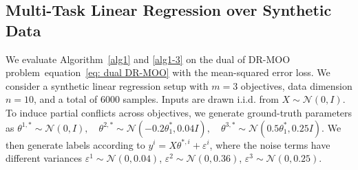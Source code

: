 \documentclass[twoside]{article} %
\def\eqref#1{equation~\ref{#1}}
\theoremstyle{plain}
\theoremstyle{definition}
\theoremstyle{remark}
\begin{document}
\subsection{Multi-Task Linear Regression over Synthetic Data}
We evaluate Algorithm~\ref{alg1} and \ref{alg1-3} on the dual of DR-MOO problem~\eqref{eq: dual DR-MOO} with the mean-squared error loss. We consider a synthetic linear regression setup with $m=3$ objectives, data dimension $n=10$, and a total of $6000$ samples. Inputs are drawn i.i.d. from $X \sim \mathcal{N}(0, I)$.
To induce partial conflicts across objectives, we generate ground-truth parameters as $
\theta^{1,*} \sim \mathcal{N}(0, I), \quad
\theta^{2,*} \sim \mathcal{N}(-0.2\theta_1^*, 0.04 I), \quad
\theta^{3,*} \sim \mathcal{N}( 0.5\theta_1^*, 0.25 I)
$. We then generate labels according to $y^{i}=X\theta^{*,i}+\varepsilon^i$, where the noise terms have different variances $\varepsilon^1 \sim \mathcal{N}(0, 0.04)$, $\varepsilon^2 \sim \mathcal{N}(0, 0.36)$, $
\varepsilon^3 \sim \mathcal{N}(0, 0.25)$. 
\end{document}
